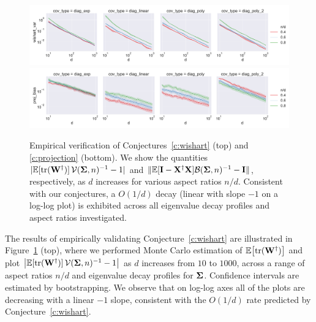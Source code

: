 
\begin{figure}[ht]
  \includegraphics[width=\textwidth]{continuous_figures/wishart_var.pdf}
  \includegraphics[width=\textwidth]{continuous_figures/proj_bias.pdf}
  \vspace{-1cm}
  \caption{
    Empirical verification of Conjectures~\ref{c:wishart} (top) and
    \ref{c:projection} (bottom).
    We show the quantities
    $|\mathbb E[\mathrm{tr}(\mathbf W^\dagger)]\,\mathcal{V}(\mathbf{\Sigma},n)^{-1} -1|$ and
    $\|\mathbb E[\mathbf I-\mathbf X^\dagger\mathbf X]\mathcal{B}(\mathbf{\Sigma},n)^{-1} - \mathbf I\|$, respectively,
    as $d$ increases for various aspect ratios $n/d$.
    Consistent with our conjectures,
    a $O(1/d)$ decay (linear with slope $-1$ on a log-log plot) is
    exhibited across all eigenvalue decay profiles and
    aspect ratios investigated.
  }
  \label{f:conj-wishart}
\end{figure}


The results of empirically validating Conjecture~\ref{c:wishart} are
illustrated in Figure~\ref{f:conj-wishart} (top), where we performed
Monte Carlo estimation of $\mathbb E\big[\mathrm{tr}(\mathbf W^\dagger)\big]$ and
plot $\big|\mathbb E[\mathrm{tr}(\mathbf W^\dagger)]\,\mathcal{V}(\mathbf{\Sigma},n)^{-1} -1\big|$
as $d$ increases from $10$ to $1000$, across a range of aspect ratios $n/d$ and eigenvalue
decay profiles for $\mathbf{\Sigma}$. Confidence intervals are estimated by
bootstrapping. We observe that on log-log axes all of the plots are decreasing with
a linear $-1$ slope, consistent with the $O(1/d)$ rate predicted
by Conjecture~\ref{c:wishart}.


